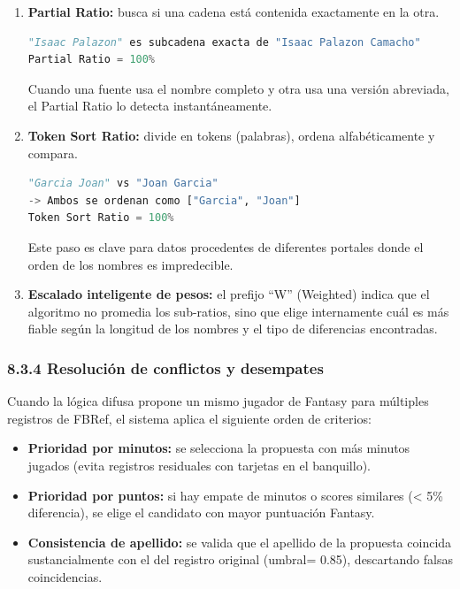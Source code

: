 \begin{enumerate}
\item \textbf{Partial Ratio:} busca si una cadena está contenida exactamente en la otra.
\begin{lstlisting}[language=Python,caption={Partial Ratio: búsqueda de subcadenas}]
"Isaac Palazon" es subcadena exacta de "Isaac Palazon Camacho"
Partial Ratio = 100%
\end{lstlisting}
Cuando una fuente usa el nombre completo y otra usa una versión abreviada, el Partial Ratio lo detecta instantáneamente.

\item \textbf{Token Sort Ratio:} divide en tokens (palabras), ordena alfabéticamente y compara.
\begin{lstlisting}[language=Python,caption={Token Sort Ratio: ordenación de tokens}]
"Garcia Joan" vs "Joan Garcia"
-> Ambos se ordenan como ["Garcia", "Joan"]
Token Sort Ratio = 100%
\end{lstlisting}
Este paso es clave para datos procedentes de diferentes portales donde el orden de los nombres es impredecible.

\item \textbf{Escalado inteligente de pesos:} el prefijo ``W'' (Weighted) indica que el algoritmo no promedia los sub-ratios, sino que 
elige internamente cuál es más fiable según la longitud de los nombres y el tipo de diferencias encontradas.
\end{enumerate}

\subsubsection{8.3.4 Resolución de conflictos y desempates}

Cuando la lógica difusa propone un mismo jugador de Fantasy para múltiples registros de FBRef, el sistema aplica el siguiente orden de criterios:

\begin{itemize}
\item \textbf{Prioridad por minutos:} se selecciona la propuesta con más minutos jugados (evita registros residuales con tarjetas en el banquillo).

\item \textbf{Prioridad por puntos:} si hay empate de minutos o scores similares (< 5\% diferencia), se elige el candidato con mayor puntuación Fantasy.

\item \textbf{Consistencia de apellido:} se valida que el apellido de la propuesta coincida sustancialmente con el del registro original (umbral= 0.85), descartando falsas coincidencias.
\end{itemize}

